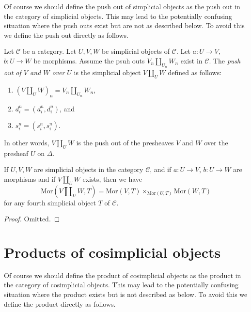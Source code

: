\noindent
Of course we should define the push out of simplicial objects
as the push out in the category of simplicial objects. This
may lead to the potentially confusing situation where the
push outs exist but are not as described below. To avoid
this we define the push out directly as follows.

\begin{definition}
\label{definition-push-out}
Let $\mathcal{C}$ be a category.
Let $U, V, W$ be simplicial objects of $\mathcal{C}$.
Let $a : U \to V$, $b : U \to W$ be morphisms.
Assume the psuh outs $V_n \amalg_{U_n} W_n$ exist in $\mathcal{C}$.
The {\it push out of $V$ and $W$ over $U$} is the simplicial object
$V\amalg_U W$ defined as follows:
\begin{enumerate}
\item $(V \amalg_U W)_n = V_n \amalg_{U_n} W_n$,
\item $d^n_i = (d^n_i, d^n_i)$, and
\item $s^n_i = (s^n_i, s^n_i)$.
\end{enumerate}
In other words, $V\amalg_U W$ is the push out of the presheaves
$V$ and $W$ over the presheaf $U$ on $\Delta$.
\end{definition}

\begin{lemma}
\label{lemma-push-out}
If $U, V, W$ are simplicial objects in the category $\mathcal{C}$,
and if $a : U \to V$, $b : U \to W$ are morphisms
and if $V\amalg_U W$ exists, then we have
$$
\text{Mor}(V\amalg_U W, T) =
\text{Mor}(V, T) \times_{\text{Mor}(U, T)}
\text{Mor}(W, T)
$$
for any fourth simplicial object $T$ of $\mathcal{C}$.
\end{lemma}

\begin{proof}
Omitted.
\end{proof}











\section{Products of cosimplicial objects}
\label{section-products-cosimplicial}

\noindent
Of course we should define the product of cosimplicial objects
as the product in the category of cosimplicial objects. This
may lead to the potentially confusing situation where the product exists
but is not described as below. To avoid this we define the product
directly as follows.

